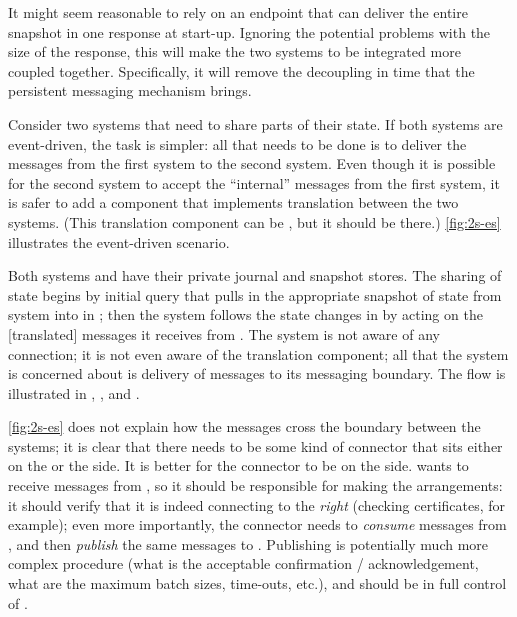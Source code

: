 \documentclass[10 pt, twocolumn]{article}
\begin{document}
It might seem reasonable to rely on an endpoint that can deliver the entire snapshot in one response at start-up. Ignoring the potential problems with the size of the response, this will make the two systems to be integrated more coupled together. Specifically, it will remove the decoupling in time that the persistent messaging mechanism brings. 

Consider two systems that need to share parts of their state. If both systems are event-driven, the task is simpler: all that needs to be done is to deliver the messages from the first system to the second system. Even though it is possible for the second system to accept the ``internal'' messages from the first system, it is safer to add a component that implements translation between the two systems. (This translation component can be , but it should be there.) \autoref{fig:2s-es} illustrates the event-driven scenario.


Both systems  and  have their private journal and snapshot stores. The sharing of state begins by initial query that pulls in the appropriate snapshot of state from system  into  in ; then the system  follows the state changes in  by acting on the [translated] messages it receives from . The system  is not aware of any connection; it is not even aware of the translation component; all that the system  is concerned about is delivery of messages to its messaging boundary. The flow is illustrated in , , and .

\autoref{fig:2s-es} does not explain how the messages cross the boundary between the systems; it is clear that there needs to be some kind of connector that sits either on the  or the  side. It is better for the connector to be on the  side.  wants to receive messages from , so it should be responsible for making the arrangements: it should verify that it is indeed connecting to the \emph{right}  (checking certificates, for example); even more importantly, the connector needs to \emph{consume} messages from , and then \emph{publish} the same messages to . Publishing is potentially much more complex procedure (what is the acceptable confirmation / acknowledgement, what are the maximum batch sizes, time-outs, etc.), and should be in full control of \cite{mirrormaker}.  
\end{document}
